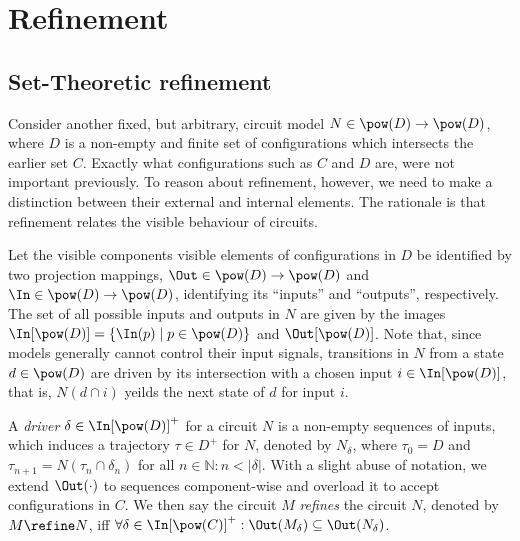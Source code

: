 \section{Refinement}

\subsection{Set-Theoretic refinement}

Consider another fixed, but arbitrary, circuit model $N \in \pow(D) \rightarrow \pow(D)$, where $D$ is a non-empty and finite set of configurations which intersects the earlier set $C$. Exactly what configurations such as $C$ and $D$ are, were not important previously. To reason about refinement, however, we need to make a distinction between their external and internal elements. The rationale is that refinement relates the visible behaviour of circuits. 


Let the visible components visible elements of configurations in $D$ be identified by two projection mappings, $\Out \in \pow(D) \rightarrow \pow(D)$ and $\In \in \pow(D) \rightarrow \pow(D)$, identifying its ``inputs'' and ``outputs'', respectively. The set of all possible inputs and outputs in $N$ are given by the images $\In[\pow(D)] = \{ \In(p) \mid p \in \pow(D) \}$ and $\Out[\pow(D)]$. Note that, since models generally cannot control their input signals, transitions in $N$ from a state $d \in \pow(D)$ are driven by its intersection with a chosen input $i \in \In[\pow(D)]$, that is, $N(d \cap i)$ yeilds the next state of $d$ for input $i$.

A \textit{driver} $\delta \in \In[\pow(D)]^{+}$ for a circuit $N$ is a non-empty sequences of inputs, which induces a trajectory $\tau \in D^{+}$ for $N$, denoted by $N_{\delta}$, where $\tau_{0} = D$ and $\tau_{n+1} = N(\tau_{n} \cap \delta_{n})$ for all $n \in \mathbb{N} : n < | \delta |$. With a slight abuse of notation, we extend $\Out(\cdot)$ to sequences component-wise and overload it to accept configurations in $C$. We then say the circuit $M$ \textit{refines} the circuit $N$, denoted by $M \refine N$, iff $\forall \delta \in \In[\pow(C)]^{+} : \Out(M_{\delta}) \subseteq \Out(N_{\delta})$.

